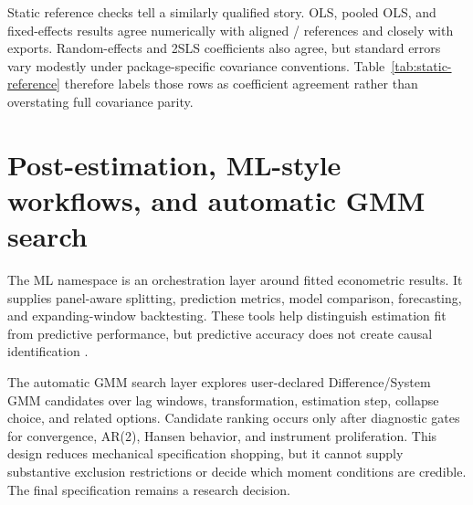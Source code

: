 \documentclass[article]{jss}
\begin{document}
\begin{table}[t!]
\centering
\small
\setlength{\tabcolsep}{4.5pt}
\renewcommand{\arraystretch}{1.16}

\caption{\label{tab:parity-diagnostics} System GMM diagnostic parity with Stata xtabond2. Source: Author's computation from the signed v0.5.14 release certificate (Artifact 24). Notes: PASS denotes cross-software numerical agreement. The over-identification column reports the Stata-side 5 percent decision and is not a model endorsement.}
\end{table}


Static reference checks tell a similarly qualified story. OLS, pooled OLS, and fixed-effects results agree
numerically with aligned / references and closely with  exports. Random-effects and 2SLS
coefficients also agree, but standard errors vary modestly under package-specific covariance conventions.
Table~\ref{tab:static-reference} therefore labels those rows as coefficient agreement rather than overstating
full covariance parity.

\begin{table}[t!]
\centering
\small
\setlength{\tabcolsep}{4.5pt}
\renewcommand{\arraystretch}{1.16}

\caption{\label{tab:static-reference} Aligned static-estimator reference checks. Source: Author's computation from the v0.5.14 cross-software checks (Artifact 27). Notes: Specifications and samples are aligned. Random-effects and 2SLS claims remain at the coefficient level because covariance conventions differ across packages.}
\end{table}


\section{Post-estimation, ML-style workflows, and automatic GMM search}
The ML namespace is an orchestration layer around fitted econometric results. It supplies panel-aware splitting,
prediction metrics, model comparison, forecasting, and expanding-window backtesting. These tools help distinguish
estimation fit from predictive performance, but predictive accuracy does not create causal identification
\citep{roberts2017crossvalidation,bergmeir2018note,cerqueira2019evaluating}.

The automatic GMM search layer explores user-declared Difference/System GMM candidates over lag windows,
transformation, estimation step, collapse choice, and related options. Candidate ranking occurs only after
diagnostic gates for convergence, AR(2), Hansen behavior, and instrument proliferation. This design reduces
mechanical specification shopping, but it cannot supply substantive exclusion restrictions or decide which
moment conditions are credible. The final specification remains a research decision.
\end{document}
